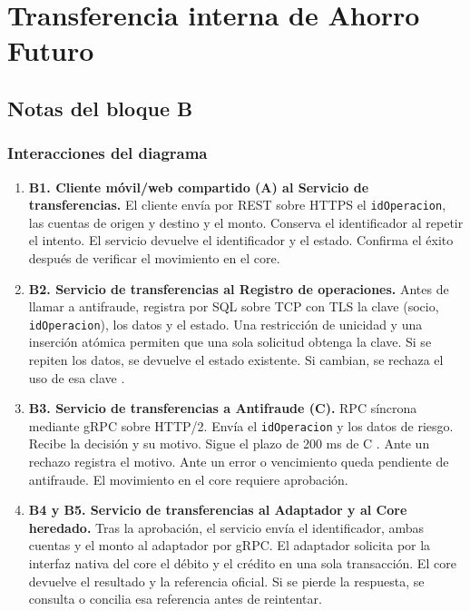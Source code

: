 \documentclass[12pt,a4paper]{article}
\begin{document}
\section{Transferencia interna de Ahorro Futuro}

\subsection{Notas del bloque B}

\subsubsection{Interacciones del diagrama}

\begin{enumerate}
    \item \textbf{B1. Cliente móvil/web compartido (A) al Servicio de transferencias.}
    El cliente envía por REST sobre HTTPS el \texttt{idOperacion}, las cuentas de origen y destino y el monto. Conserva el identificador al repetir el intento. El servicio devuelve el identificador y el estado. Confirma el éxito después de verificar el movimiento en el core.

    \item \textbf{B2. Servicio de transferencias al Registro de operaciones.}
    Antes de llamar a antifraude, registra por SQL sobre TCP con TLS la clave (socio, \texttt{idOperacion}), los datos y el estado. Una restricción de unicidad y una inserción atómica permiten que una sola solicitud obtenga la clave. Si se repiten los datos, se devuelve el estado existente. Si cambian, se rechaza el uso de esa clave \cite{featonbyretries}.

    \item \textbf{B3. Servicio de transferencias a Antifraude (C).}
    RPC síncrona mediante gRPC sobre HTTP/2. Envía el \texttt{idOperacion} y los datos de riesgo. Recibe la decisión y su motivo. Sigue el plazo de 200 ms de C \cite{grpcdeadlines}. Ante un rechazo registra el motivo. Ante un error o vencimiento queda pendiente de antifraude. El movimiento en el core requiere aprobación.

    \item \textbf{B4 y B5. Servicio de transferencias al Adaptador y al Core heredado.}
    Tras la aprobación, el servicio envía el identificador, ambas cuentas y el monto al adaptador por gRPC. El adaptador solicita por la interfaz nativa del core el débito y el crédito en una sola transacción. El core devuelve el resultado y la referencia oficial. Si se pierde la respuesta, se consulta o concilia esa referencia antes de reintentar.


\end{enumerate}
\end{document}
